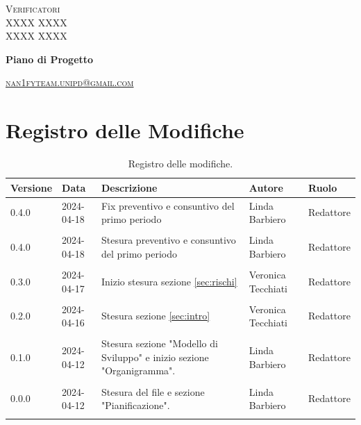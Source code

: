 \documentclass[8pt]{article}
\begin{document}
\begin{titlepage}
\begin{minipage}[t]{0.47\textwidth}
		{\large{\textsc{Verificatori}}
			\vspace{3mm}
			{\\\large{\textsc{XXXX XXXX}\\}}
			{\large{\textsc{XXXX XXXX}}}
			
		}
		\vspace{4mm}\vspace{4mm}
	\end{minipage}
	\vspace{4cm}
	\begin{center}
		\begin{flushright}
			{\fontsize{30pt}{52pt}\selectfont \textbf{Piano di Progetto\\}} %
		\end{flushright}
		\vspace{3cm}
	\end{center}
	\vspace{8 cm}
	{\small \textsc{\href{mailto: nan1fyteam.unipd@gmail.com}{nan1fyteam.unipd@gmail.com}}}
\end{titlepage}
\pagestyle{mystyle}
\section*{Registro delle Modifiche}
\begin{table}[ht!]	
\hypersetup{hidelinks}
	\centering
	\begin{tabular}{p{1.2cm} p{2cm} p{6cm} p{3cm} p{2cm}}
		\toprule
		\textbf{Versione}& \textbf{Data} & \textbf{Descrizione} & \textbf{Autore} & \textbf{Ruolo} \\
		\midrule
		0.4.0 & 2024-04-18 & Fix preventivo e consuntivo del primo periodo & Linda Barbiero & Redattore \\\\
		0.4.0 & 2024-04-18 & Stesura preventivo e consuntivo del primo periodo & Linda Barbiero & Redattore \\\\
		0.3.0 & 2024-04-17 & Inizio stesura sezione \ref{sec:rischi} & Veronica Tecchiati & Redattore \\\\
		0.2.0 & 2024-04-16 & Stesura sezione \ref{sec:intro} & Veronica Tecchiati & Redattore \\\\
		0.1.0 & 2024-04-12 & Stesura sezione "Modello di Sviluppo" e inizio sezione "Organigramma". & Linda Barbiero & Redattore \\\\
		0.0.0 & 2024-04-12 & Stesura del file e sezione "Pianificazione". & Linda Barbiero &
		Redattore \\\\ %
		\bottomrule
	\end{tabular}
	\caption{Registro delle modifiche.}
	\label{table:Registro delle modifiche}
\end{table}
\newpage
{\hypersetup{hidelinks} \tableofcontents}
\clearpage
\newpage
\justifying
\end{document}
